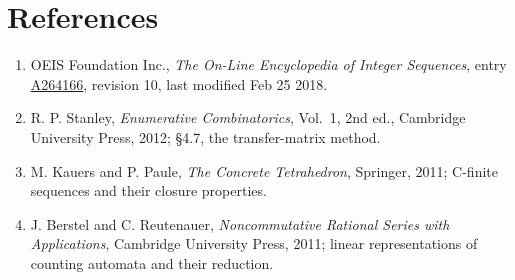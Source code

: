\documentclass[11pt]{article}
\theoremstyle{definition}
\begin{document}
\section{References}

\begin{enumerate}

\item OEIS Foundation Inc., \emph{The On-Line Encyclopedia of Integer Sequences}, entry \href{https://oeis.org/A264166}{A264166}, revision 10, last modified Feb 25 2018.

\item R. P. Stanley, \emph{Enumerative Combinatorics}, Vol.~1, 2nd ed., Cambridge University Press, 2012; \S4.7, the transfer-matrix method.

\item M. Kauers and P. Paule, \emph{The Concrete Tetrahedron}, Springer, 2011; C-finite sequences and their closure properties.

\item J. Berstel and C. Reutenauer, \emph{Noncommutative Rational Series with Applications}, Cambridge University Press, 2011; linear representations of counting automata and their reduction.

\end{enumerate}
\end{document}

